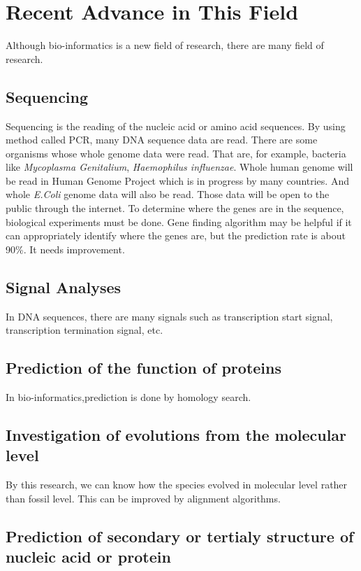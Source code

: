 \section{Recent Advance in This Field}

Although bio-informatics is a new field of research, 
there are many field of research.

\subsection{Sequencing}

Sequencing is the reading of the nucleic acid or amino acid sequences.
By using method called PCR, many DNA sequence data are read.
There are some organisms whose whole genome data were read.
That are, for example, bacteria like {\it Mycoplasma Genitalium},
{\it Haemophilus influenzae}. Whole human genome will be read in
Human Genome Project which is in progress by many countries.
And whole {\it E.Coli} genome data will also be read.
Those data will be open to the public through
the internet. To determine where the genes are in the sequence,
biological experiments must be done. Gene finding algorithm may be
helpful if it can appropriately identify where the genes are, but
the prediction rate is about 90\%. It needs improvement.

\subsection{Signal Analyses}

In DNA sequences, there are many signals such as transcription start signal,
transcription termination signal, etc.


\subsection{Prediction of the function of proteins}

In bio-informatics,prediction is done by homology search.

\subsection{Investigation of evolutions from the molecular level}

By this research, we can know how the species evolved in molecular level
rather than fossil level. This can be improved by alignment algorithms.


\subsection{Prediction of secondary or tertialy structure of nucleic 
acid or protein}


